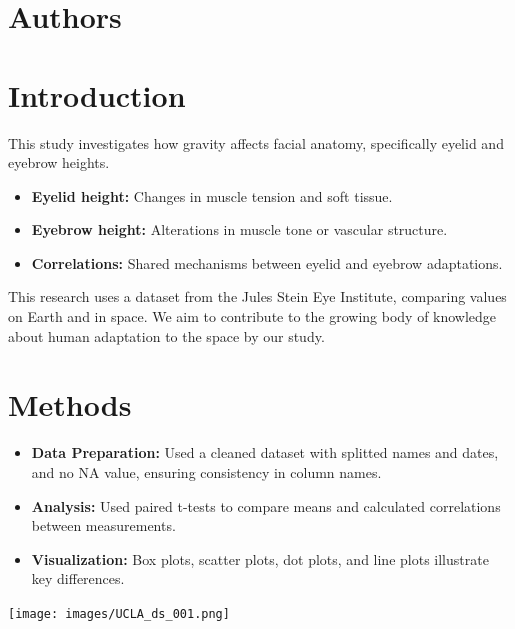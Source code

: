 \documentclass[a0paper,fleqn]{betterposter}
\begin{document}
{\section{Authors}
\author{Evelyn Yi Tsing Ng}
\author{Jamie Tian}
\author{Qianping Wu}
\author{Katherine Jin}
\author{Xuanang Li}
\author{Yangsheng Xu}


\section{Introduction}
This study investigates how gravity affects facial anatomy, specifically eyelid and eyebrow heights. 

\begin{itemize}
\item \textbf{Eyelid height:} Changes in muscle tension and soft tissue.
\item \textbf{Eyebrow height:} Alterations in muscle tone or vascular structure.
\item \textbf{Correlations:} Shared mechanisms between eyelid and eyebrow adaptations.
\end{itemize}

This research uses a dataset from the Jules Stein Eye Institute, comparing values on Earth and in space. We aim to contribute to the growing body of knowledge about human adaptation to the space by our study.

\section{Methods}
\begin{itemize}
\item \textbf{Data Preparation:} Used a cleaned dataset with splitted names and dates, and no NA value, ensuring consistency in column names.
\item \textbf{Analysis:} Used paired t-tests to compare means and calculated correlations between measurements.
\item \textbf{Visualization:} Box plots, scatter plots, dot plots, and line plots illustrate key differences. \\
\end{itemize}

\begin{center}
\texttt{[image: images/UCLA\_ds\_001.png]} 
\end{center}


}
\end{document}
